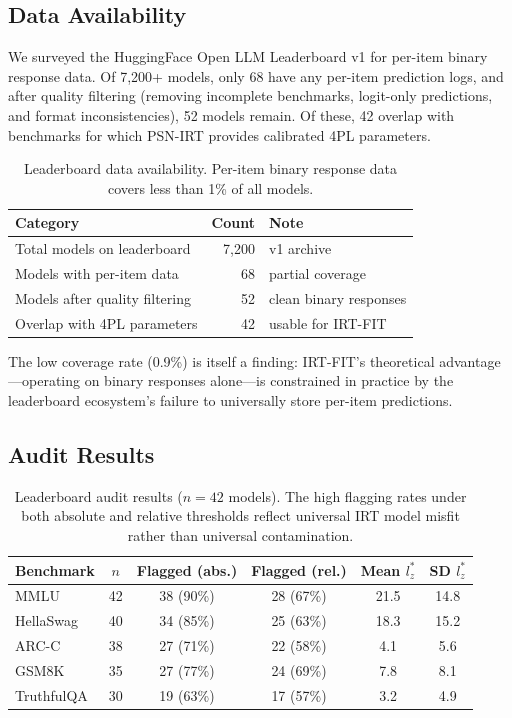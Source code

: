 \documentclass[11pt]{article}
\begin{document}
\subsection{Data Availability}

We surveyed the HuggingFace Open LLM Leaderboard v1 for per-item binary response data.
Of 7,200+ models, only 68 have any per-item prediction logs, and after quality filtering (removing incomplete benchmarks, logit-only predictions, and format inconsistencies), 52 models remain.
Of these, 42 overlap with benchmarks for which PSN-IRT provides calibrated 4PL parameters.

\begin{table}[t]
\centering
\caption{Leaderboard data availability. Per-item binary response data covers less than 1\% of all models.}
\label{tab:data-avail}
\begin{tabular}{lrl}
\toprule
Category & Count & Note \\
\midrule
Total models on leaderboard    & 7,200  & v1 archive \\
Models with per-item data      & 68     & partial coverage \\
Models after quality filtering & 52     & clean binary responses \\
Overlap with 4PL parameters    & 42     & usable for IRT-FIT \\
\bottomrule
\end{tabular}
\end{table}

The low coverage rate (0.9\%) is itself a finding: IRT-FIT's theoretical advantage---operating on binary responses alone---is constrained in practice by the leaderboard ecosystem's failure to universally store per-item predictions.

\subsection{Audit Results}

\begin{table}[t]
\centering
\caption{Leaderboard audit results ($n = 42$ models). The high flagging rates under both absolute and relative thresholds reflect universal IRT model misfit rather than universal contamination.}
\label{tab:leaderboard-audit}
\begin{tabular}{lccccc}
\toprule
Benchmark & $n$ & Flagged (abs.) & Flagged (rel.) & Mean $l_z^*$ & SD $l_z^*$ \\
\midrule
MMLU      & 42 & 38 (90\%) & 28 (67\%) & 21.5 & 14.8 \\
HellaSwag & 40 & 34 (85\%) & 25 (63\%) & 18.3 & 15.2 \\
ARC-C     & 38 & 27 (71\%) & 22 (58\%) &  4.1 &  5.6 \\
GSM8K     & 35 & 27 (77\%) & 24 (69\%) &  7.8 &  8.1 \\
TruthfulQA& 30 & 19 (63\%) & 17 (57\%) &  3.2 &  4.9 \\
\bottomrule
\end{tabular}
\end{table}
\end{document}
